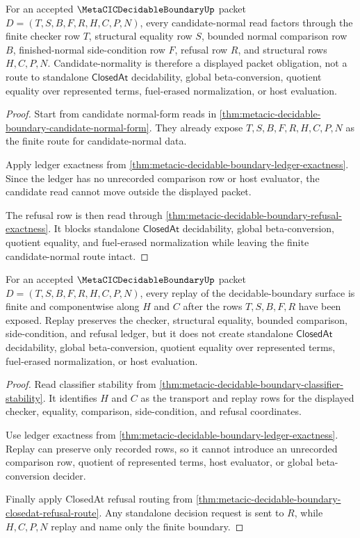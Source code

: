 \begin{theorem}
\label{thm:metacic-decidable-boundary-candidate-obligation}
For an accepted $\MetaCICDecidableBoundaryUp$ packet $D=(T,S,B,F,R,H,C,P,N)$, every candidate-normal read factors through the finite checker row $T$, structural equality row $S$, bounded normal comparison row $B$, finished-normal side-condition row $F$, refusal row $R$, and structural rows $H,C,P,N$. Candidate-normality is therefore a displayed packet obligation, not a route to standalone $\mathsf{ClosedAt}$ decidability, global beta-conversion, quotient equality over represented terms, fuel-erased normalization, or host evaluation.
\end{theorem}
\begin{proof}
Start from candidate normal-form reads in \autoref{thm:metacic-decidable-boundary-candidate-normal-form}. They already expose $T,S,B,F,R,H,C,P,N$ as the finite route for candidate-normal data.

Apply ledger exactness from \autoref{thm:metacic-decidable-boundary-ledger-exactness}. Since the ledger has no unrecorded comparison row or host evaluator, the candidate read cannot move outside the displayed packet.

The refusal row is then read through \autoref{thm:metacic-decidable-boundary-refusal-exactness}. It blocks standalone $\mathsf{ClosedAt}$ decidability, global beta-conversion, quotient equality, and fuel-erased normalization while leaving the finite candidate-normal route intact.
\end{proof}

\begin{theorem}
\label{thm:metacic-decidable-boundary-replay-obligation}
For an accepted $\MetaCICDecidableBoundaryUp$ packet $D=(T,S,B,F,R,H,C,P,N)$, every replay of the decidable-boundary surface is finite and componentwise along $H$ and $C$ after the rows $T,S,B,F,R$ have been exposed. Replay preserves the checker, structural equality, bounded comparison, side-condition, and refusal ledger, but it does not create standalone $\mathsf{ClosedAt}$ decidability, global beta-conversion, quotient equality over represented terms, fuel-erased normalization, or host evaluation.
\end{theorem}
\begin{proof}
Read classifier stability from \autoref{thm:metacic-decidable-boundary-classifier-stability}. It identifies $H$ and $C$ as the transport and replay rows for the displayed checker, equality, comparison, side-condition, and refusal coordinates.

Use ledger exactness from \autoref{thm:metacic-decidable-boundary-ledger-exactness}. Replay can preserve only recorded rows, so it cannot introduce an unrecorded comparison row, quotient of represented terms, host evaluator, or global beta-conversion decider.

Finally apply ClosedAt refusal routing from \autoref{thm:metacic-decidable-boundary-closedat-refusal-route}. Any standalone decision request is sent to $R$, while $H,C,P,N$ replay and name only the finite boundary.
\end{proof}

